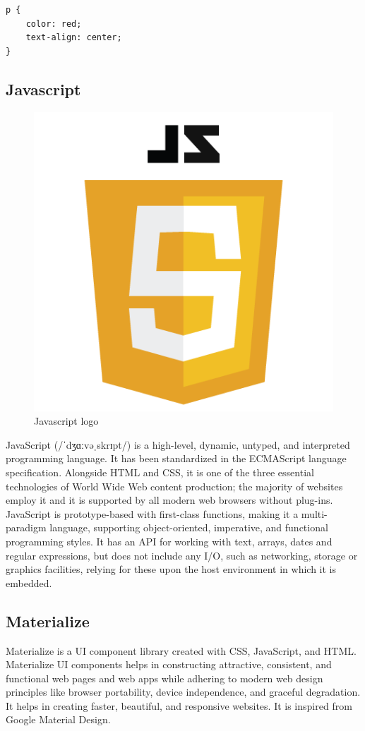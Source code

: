 \begin{verbatim}
p {
    color: red;
    text-align: center;
} 
\end{verbatim}

\subsection{Javascript}
\begin{figure}[h]
\centering \includegraphics[scale=0.3]{images/JS.png}
\caption{Javascript logo}
\end{figure}
JavaScript (/ˈdʒɑːvəˌskrɪpt/) is a high-level, dynamic, untyped, and interpreted programming language. It has been standardized in the ECMAScript language specification. Alongside HTML and CSS, it is one of the three essential technologies of World Wide Web content production; the majority of websites employ it and it is supported by all modern web browsers without plug-ins. JavaScript is prototype-based with first-class functions, making it a multi-paradigm language, supporting object-oriented, imperative, and functional programming styles. It has an API for working with text, arrays, dates and regular expressions, but does not include any I/O, such as networking, storage or graphics facilities, relying for these upon the host environment in which it is embedded.

\subsection{Materialize} 
Materialize is a UI component library created with CSS, JavaScript, and HTML. Materialize UI components helps in constructing attractive, consistent, and functional web pages and web apps while adhering to modern web design principles like browser portability, device independence, and graceful degradation. It helps in creating faster, beautiful, and responsive websites. It is inspired from Google Material Design.
